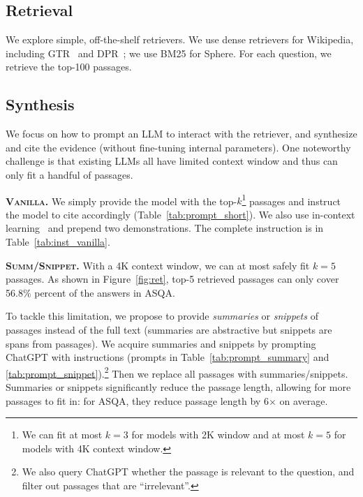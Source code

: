 \documentclass[11pt]{article}
\renewcommand{\paragraph}[1]{\vspace{0.2cm}\noindent\textbf{#1}}
\newcommand{\pvani}{Vanilla}
\newcommand{\psumm}{Summ}
\newcommand{\psnippet}{Snippet}
\begin{document}


\subsection{Retrieval}
\label{sec:retrieval}

We explore simple, off-the-shelf retrievers.
We use dense retrievers  for Wikipedia, including GTR~\cite{ni-etal-2022-large} and DPR~\cite{karpukhin-etal-2020-dense}; 
we use 
BM25 for Sphere. %
For each question,
we 
retrieve the top-100 passages. %



\subsection{Synthesis}
\label{sec:synthesis}





We  focus on %
how to
prompt an LLM to 
interact with the retriever, and 
synthesize and cite the evidence (without fine-tuning internal parameters).
One noteworthy challenge is that existing %
LLMs all have limited context window and thus
can only fit a handful of passages.





\paragraph{\textsc{\pvani{}}.}
We simply provide the model with the top-$k$\footnote{We can fit at most $k=3$ for models with 2K window and at most $k=5$ for models with 4K context window.} passages and instruct the model to cite accordingly (Table~\ref{tab:prompt_short}).
We also use in-context learning~\cite{brown2020language} and prepend two demonstrations.
The complete instruction is in Table~\ref{tab:inst_vanilla}.


\paragraph{\textsc{\psumm}/\textsc{\psnippet{}}.}
With a 4K context window, we can at most safely fit $k=5$ passages. As shown in Figure~\ref{fig:ret}, top-5 retrieved passages can only cover 56.8\% percent of the answers in ASQA. 

To tackle this limitation, we propose to provide \textit{summaries} or \textit{snippets} of passages instead of the full text (summaries are abstractive but snippets are spans from passages). 
We acquire summaries and snippets by prompting ChatGPT with instructions (prompts in Table~\ref{tab:prompt_summary} and \ref{tab:prompt_snippet}).\footnote{We also query ChatGPT whether the passage is relevant to the question, and
filter out passages that are ``irrelevant''.}
Then we replace all passages with  summaries/snippets.
Summaries or snippets significantly reduce the passage length, allowing for more passages to fit in:
for ASQA, they reduce passage length by 6$\times$ on average.
\end{document}
